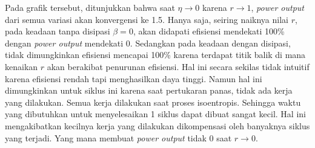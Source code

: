\noindent Pada grafik tersebut, ditunjukkan bahwa saat \(\eta \rightarrow 0\) karena \(r \rightarrow 1\), \textit{power output} dari semua variasi akan konvergensi ke 1.5. Hanya saja, seiring naiknya nilai \(r\), pada keadaan tanpa disipasi \(\beta = 0\), akan didapati efisiensi mendekati 100\% dengan \textit{power output} mendekati 0. Sedangkan pada keadaan dengan disipasi, tidak dimungkinkan efisiensi mencapai 100\% karena terdapat titik balik di mana kenaikan \(r\) akan berakibat penurunan efisiensi. Hal ini secara sekilas tidak intuitif karena efisiensi rendah tapi menghasilkan daya tinggi. Namun hal ini dimungkinkan untuk siklus ini karena saat pertukaran panas, tidak ada kerja yang dilakukan. Semua kerja dilakukan saat proses isoentropis. Sehingga waktu yang dibutuhkan untuk menyelesaikan 1 siklus dapat dibuat sangat kecil. Hal ini mengakibatkan kecilnya kerja yang dilakukan dikompensasi oleh banyaknya siklus yang terjadi. Yang mana membuat \textit{power output} tidak 0 saat \(r \rightarrow 0\). \cite{Pena2020QHE}

